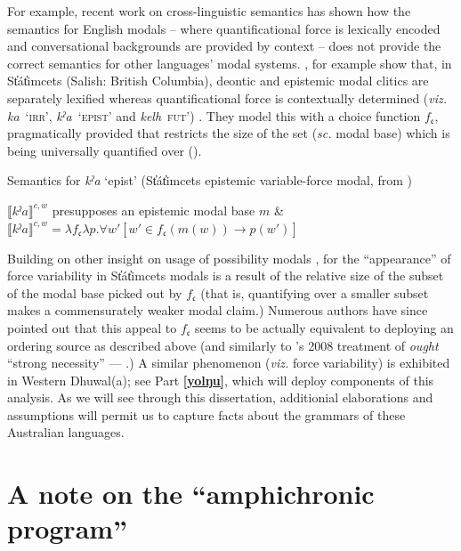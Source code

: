 \documentclass[12pt,dvipsnames]{report}
\providecommand{\denote}[2][]{\ensuremath{\llbracket{#2}\rrbracket^{#1}}}
\begin{document}
For example, recent work on cross-linguistic semantics has shown how the semantics for English modals -- where quantificational force is lexically encoded and conversational backgrounds are provided by context -- does not provide the correct semantics for other languages' modal systems. \citet{Rullmann2008}, for example show that, in St̓át̓imcets (Salish: British Columbia), deontic and epistemic modal clitics are separately lexified whereas quantificational force is contextually determined (\textit{viz.} \textit{ka}~`\textsc{irr}', \textit{kˀa}~`\textsc{epist}' and \textit{kelh}~\textsc{fut}') \citep[see also][]{Peterson2010,Matthewson2010}. They model this with a choice function $ f_{\mathfrak c}$, pragmatically provided that restricts the size of the set (\textit{sc.} modal base) which is being universally quantified over (\nextx).

\pex Semantics for \textit{kˀa} `\gls{epist}' (St̓át̓imcets epistemic variable-force modal, from \citealp[340]{Rullmann2008})

\denote[c,w]{\textit{kˀa}} presupposes an epistemic modal base $ m $ \&\\
$ \denote[c,w]{\textit{kˀa}}=\lambda f_{\mathfrak c}\lambda p.\forall w'[w'\in f_{\mathfrak c}(m(w))\to p(w')]$
\xe

Building on other insight on usage of possibility modals \citep[notably][]{Klinedinst2007}, for \citet{Rullmann2008} the ``appearance'' of force variability in St̓át̓imcets modals is a result of the relative size of the subset of the modal base picked out by $ f_{\mathfrak c} $ (that is, quantifying over a smaller subset makes a commensurately weaker modal claim.) Numerous authors have since pointed out that this appeal to $ f_{\mathfrak c} $ seems to be actually equivalent to deploying an ordering source as described above (and similarly to \citeauthor{VonFintel2008}'s 2008 treatment of \textit{ought} ``strong necessity'' --- \citealp[see][]{Portner2009,Matthewson2010,Peterson2008}.)
 A similar phenomenon (\textit{viz.} force variability) is exhibited in Western Dhuwal(a); see Part \textbf{\ref{yolŋu}}, which will deploy components of this analysis. As we will see through this dissertation, additionial elaborations and assumptions will permit us to capture facts about the grammars of these Australian languages.

\section{A note on the ``amphichronic program''}\label{amph}
\end{document}
